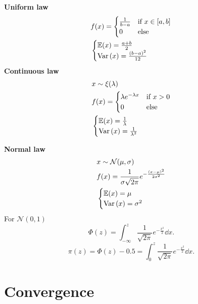 \documentclass{report}
\begin{document}
\begin{enumerate}
	\ii \textbf{Uniform law}
	\begin{align*}
		 & f(x) = \begin{cases}
			          \frac{1}{b-a} & \text{if } x\in[a,b] \\
			          0             & \text{else}
		          \end{cases} \\
		 & \begin{cases}
			   \mathbb{E}(x) =  \frac{a+b}{2} \\
			   \mathrm{Var}\left( x \right) = \frac{(b-a)^2}{12}
		   \end{cases}
	\end{align*}
	\ii \textbf{Continuous law}
	\begin{align*}
		 & x \sim \xi(\lambda)                            \\
		 & f(x) = \begin{cases}
			          \lambda e^{-\lambda x} & \text{if } x>0 \\
			          0                      & \text{else}
		          \end{cases} \\
		 & \begin{cases}
			   \mathbb{E}(x) =  \frac{1}{\lambda} \\
			   \mathrm{Var}\left( x \right) = \frac{1}{\lambda^2}
		   \end{cases}
	\end{align*}

	\ii \textbf{Normal law}
	\begin{align*}
		 & x \sim \mathcal{N}(\mu,\sigma)                                     \\
		 & f(x) = \frac{1}{\sigma\sqrt{2\pi}}e^{-\frac{(x-\mu)^2}{2\sigma^2}} \\
		 & \begin{cases}
			   \mathbb{E}(x) =  \mu \\
			   \mathrm{Var}\left( x \right) = \sigma^2
		   \end{cases}
	\end{align*}
	For $\mathcal{N}(0,1)$
	\[
		\Phi(z) = \int_{-\infty}^z\frac{1}{\sqrt{2\pi}}e^{-\frac{x^2}{2}}\dd{x}
		.\]
	\[
		\pi(z) = \Phi(z) - 0.5 = \int_0^z\frac{1}{\sqrt{2\pi}}e^{-\frac{x^2}{2}}\dd{x}
		.\]

\end{enumerate}

\section{Convergence}
\end{document}
